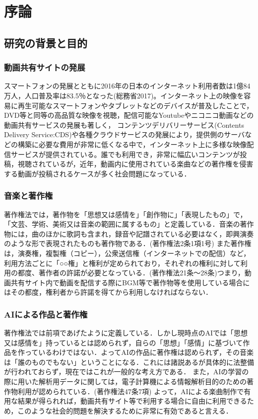 \chapter{序論}
\section{研究の背景と目的}
\subsection{動画共有サイトの発展}
スマートフォンの発展とともに2016年の日本のインターネット利用者数は1億84万人，人口普及率は83.5％となった(総務省2017)。インターネット上の映像を容易に再生可能なスマートフォンやタブレットなどのデバイスが普及したことで，DVD等と同等の高品質な映像を視聴，配信可能なYoutube\cite{webpage}やニコニコ動画\cite{webpage9}などの動画共有サービスの発展も著しく，
コンテンツデリバリーサービス(Contents Delivery Service:CDS)や各種クラウドサービスの発展により，提供側のサーバなどの構築に必要な費用が非常に低くなる中で，インターネット上に多様な映像配信サービスが提供されている。誰でも利用でき，非常に幅広いコンテンツが投稿，視聴されているが，近年，動画内に使用されている楽曲などの著作権を侵害する動画が投稿されるケースが多く社会問題になっている．
\subsection{音楽と著作権}
著作権法では，著作物を「思想又は感情を」「創作物に」「表現したもの」で，「文芸、学術、美術又は音楽の範囲に属するもの」と定義している．音楽の著作物には，曲のほかに歌詞も含まれ，録音や記譜されている必要はなく，即興演奏のような形で表現されたものも著作物である．(著作権法2条1項1号)
また著作権は，演奏権，複製権（コピー），公衆送信権（インターネットでの配信）など，利用方法ごとに「○○権」と権利が定められており，それぞれの権利に対して利用の都度、著作者の許諾が必要となっている．(著作権法21条～28条)つまり，動画共有サイト内で動画を配信する際にBGM等で著作物等を使用している場合にはその都度，権利者から許諾を得てから利用しなければならない．
\newpage
\subsection{AIによる作品と著作権}
著作権法では前項であげたように定義している．しかし現時点のAIでは「思想又は感情を」持っているとは認められず，自らの「思想」「感情」に基づいて作品を作っているわけではない．よってAIの作品に著作権は認められず，その音楽は「誰のものでもない」ということになる．これには諸説あるが具体的に法整備が行われておらず，現在ではこれが一般的な考え方である．
また，AIの学習の際に用いた解析用データに関しては，電子計算機による情報解析目的のための著作物利用が認められている．(著作権法47条7項)
よって，AIによる楽曲制作で有用な結果が得られれば，動画共有サイト等で利用する場合に自由に利用できるため，このような社会的問題を解決するために非常に有効であると言える．
